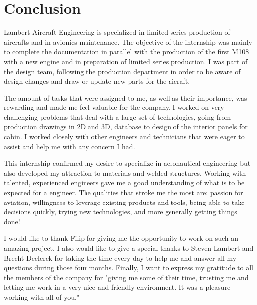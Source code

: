 \documentclass[11pt,a4paper]{report}
\begin{document}
\newpage

\section{Conclusion}
Lambert Aircraft Engineering is specialized in limited series production of aircrafts and in avionics maintenance. The objective of the internship was mainly to complete the documentation in parallel with the production of the first M108 with a new engine and in preparation of limited series production. I was part of the design team, following the production department in order to be aware of design changes and draw or update new parts for the aicraft.

\bigskip

The amount of tasks that were assigned to me, as well as their importance, was rewarding and made me feel valuable for the company. I worked on very challenging problems that deal with a large set of technologies, going from production drawings in 2D and 3D, database to design of the interior panels for cabin. I worked closely with other engineers and technicians that were eager to assist and help me with any concern I had.

\bigskip

This internship confirmed my desire to specialize in aeronautical engineering but also developed my attraction to materials and welded structures. Working with talented, experienced engineers gave me a good understanding of what is to be expected for a engineer. The qualities that stroke me the most are: passion for aviation, willingness to leverage existing products and tools, being able to take decisions quickly, trying new technologies, and more generally getting things done!

\bigskip

I would like to thank Filip for giving me the opportunity to work on such an amazing project. I also would like to give a special thanks to Steven Lambert and Brecht Declerck for taking the time every day to help me and answer all my questions during those four months. Finally, I want to express my gratitude to all the members of the company for "giving me some of their time, trusting me and letting me work in a very nice and friendly environment. It was a pleasure working with all of you." %
\end{document}
